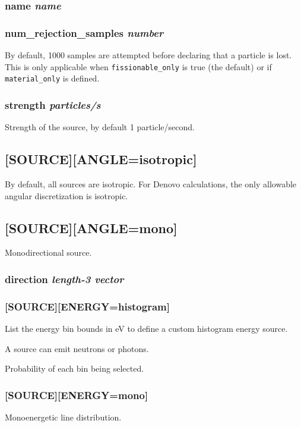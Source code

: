 \documentclass[10pt]{article}
\newcounter{subsubsubsection}[subsubsection]
\begin{document}
\subsubsection{name \textit{name}}

\subsubsection{num\_rejection\_samples \textit{number}} 
By default, 1000 samples are attempted before declaring that a particle is lost. This is only applicable when \texttt{fissionable\_only} is true (the default) or if \texttt{material\_only} is defined. 

\subsubsection{strength \textit{particles/s}} 
Strength of the source, by default 1 particle/second.

\subsection{[SOURCE][ANGLE=isotropic]}
By default, all sources are isotropic. For Denovo calculations, the only allowable angular discretization is isotropic. 

\subsection{[SOURCE][ANGLE=mono]}
Monodirectional source.

\subsubsection{direction \textit{length-3 vector}}

\subsubsection{[SOURCE][ENERGY=histogram]}

List the energy bin bounds in eV to define a custom histogram energy source.

A source can emit neutrons or photons. 

Probability of each bin being selected.

\subsubsection{[SOURCE][ENERGY=mono]}
Monoenergetic line distribution.
\end{document}
